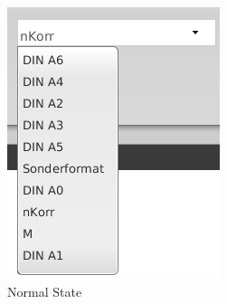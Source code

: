 \begin{figure}
        \centering
        \begin{subfigure}[b]{0.3\textwidth}
                \includegraphics[width=\textwidth]{./img/impl/context_menu.png}
                \caption{Normal State}
                \label{fig:context_menu}
        \end{subfigure}%
        ~ %
        \begin{subfigure}[b]{0.3\textwidth}

\end{subfigure}
\end{figure}
